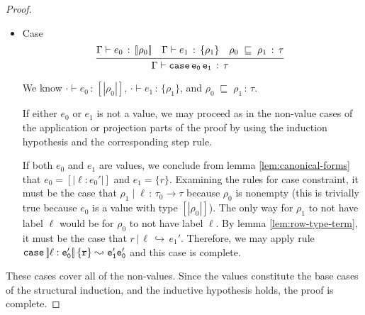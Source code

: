 \documentclass{article}
\newcommand{\G}{\Gamma}
\newcommand{\variant}[1]{[\!|#1|\!]}
\newcommand{\case}[2]{\tt{case}\,#1\,#2}
\newcommand{\hastp}[3]{#1 \vdash #2 \,:\, #3}
\newcommand{\haslbl}[3]{#1\;|\;#2\,:\, #3}
\newcommand{\caseVarRcd}[3]{#1 \;\sqsubseteq\; #2 \,:\, #3}
\newcommand{\haslbltm}[3]{#1\,|\,#2\,\hookrightarrow\, #3}
\newcommand{\step}[2]{#1 \leadsto #2}
\newcommand{\deduct}[3][]
{
  \begin{prooftree}
    \hypo{#2}
    \infer1[\text{#1}]{#3}
  \end{prooftree}
}
\begin{document}
\begin{proof}
\begin{itemize}
  \item Case
    \[
      \deduct
      {\hastp{\G}{e_0}{\variant{\rho_0}}
      \quad
      \hastp{\G}{e_1}{\{\rho_1\}}
      \quad
      \caseVarRcd{\rho_0}{\rho_1}{\tau}
      }
      {\hastp{\G}{\case{e_0}{e_1}}{\tau}}
      {}
    \]

    We know \(\hastp \cdot {e_0} {\variant {\rho_0}}\), \(\hastp \cdot {e_1}
    {\{\rho_1\}}\), and \(\caseVarRcd {\rho_0} {\rho_1} \tau\).

    If either \(e_0\) or \(e_1\) is not a value, we may proceed as in the
    non-value cases of the application or projection parts of the proof by using
    the induction hypothesis and the corresponding step rule.

    If both \(e_0\) and \(e_1\) are values, we conclude from lemma
    \ref{lem:canonical-forms} that \(e_0 = \variant{\ell : e_0'}\) and \(e_1 =
    \{r\}\). Examining the rules for case constraint, it must be the case that
    \(\haslbl {\rho_1} \ell {\tau_0 \to \tau}\) because \(\rho_0\) is nonempty
    (this is trivially true because \(e_0\) is a value with type \(\variant
    {\rho_0}\)). The only way for \(\rho_1\) to not have label \(\ell\) would be
    for \(\rho_0\) to not have label \(\ell\). By lemma \ref{lem:row-type-term},
    it must be the case that \(\haslbltm{r}{\ell}{e_1'}\). Therefore, we may
    apply rule \(\step {\case {\variant {\ell : e_0'}} {\{r\}}} {e_1' e_0'}\)
    and this case is complete.

\end{itemize}

These cases cover all of the non-values. Since the values constitute the base
cases of the structural induction, and the inductive hypothesis holds, the proof
is complete.

\end{proof}
\end{document}
